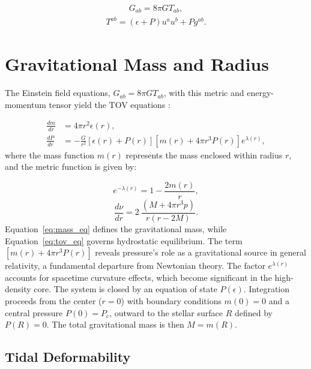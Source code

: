 \begin{align}
 	G_{ab} = 8\pi G T_{ab},
 \end{align}
 \begin{align}
 	T^{ab} = (\epsilon + P)u^{a}u^{b} + Pg^{ab}.
 \end{align}
 \noindent
 \section{Gravitational Mass and Radius}
 
 The Einstein field equations, $G_{ab} = 8\pi G T_{ab}$, with this metric and energy-momentum tensor yield the TOV equations \cite{PhysRev.55.364,PhysRev.55.374,Shapiro_1983}:
 
 \begin{align}
 	\frac{dm}{dr} &= 4\pi r^{2} \epsilon(r), \label{eq:mass_eq} \\
 	\frac{dP}{dr} &= -\frac{G}{r^{2}} \left[\epsilon(r) + P(r)\right] \left[m(r) + 4\pi r^{3} P(r)\right] e^{\lambda(r)}, \label{eq:tov_eq}
 \end{align}
 \noindent
 where the mass function $m(r)$ represents the mass enclosed within radius $r$, and the metric function is given by:
 
 \begin{equation}
 	e^{-\lambda(r)}=1-\frac{2m(r)}{r},
 \end{equation}
 \begin{equation}
 	\frac{d\nu}{dr}=2~{}\frac{(M+4\pi r^{3}p)}{r(r-2M)}.
 \end{equation}
 \noindent
 Equation~\eqref{eq:mass_eq} defines the gravitational mass, while Equation~\eqref{eq:tov_eq} governs hydrostatic equilibrium. The term $\left[m(r) + 4\pi r^{3} P(r)\right]$ reveals pressure's role as a gravitational source in general relativity, a fundamental departure from Newtonian theory. The factor $e^{\lambda(r)}$ accounts for spacetime curvature effects, which become significant in the high-density core. The system is closed by an equation of state $P(\epsilon)$. Integration proceeds from the center ($r=0$) with boundary conditions $m(0) = 0$ and a central pressure $P(0) = P_c$, outward to the stellar surface $R$ defined by $P(R) = 0$. The total gravitational mass is then $M = m(R)$.
 
 
 \subsection{Tidal Deformability}
 \label{sec:2.2}
 

